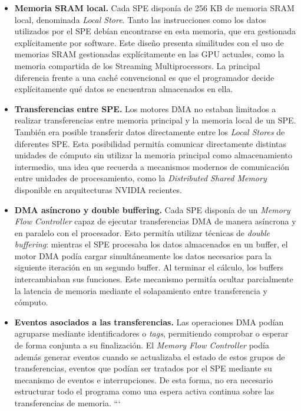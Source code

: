 \begin{itemize}

```
\item \textbf{Memoria SRAM local.}
Cada SPE disponía de 256 KB de memoria SRAM local, denominada \textit{Local Store}. Tanto las instrucciones como los datos utilizados por el SPE debían encontrarse en esta memoria, que era gestionada explícitamente por software. Este diseño presenta similitudes con el uso de memorias SRAM gestionadas explícitamente en las GPU actuales, como la memoria compartida de los Streaming Multiprocessors. La principal diferencia frente a una caché convencional es que el programador decide explícitamente qué datos se encuentran almacenados en ella.

\item \textbf{Transferencias entre SPE.}
Los motores DMA no estaban limitados a realizar transferencias entre memoria principal y la memoria local de un SPE. También era posible transferir datos directamente entre los \textit{Local Stores} de diferentes SPE. Esta posibilidad permitía comunicar directamente distintas unidades de cómputo sin utilizar la memoria principal como almacenamiento intermedio, una idea que recuerda a mecanismos modernos de comunicación entre unidades de procesamiento, como la \textit{Distributed Shared Memory} disponible en arquitecturas NVIDIA recientes.

\item \textbf{DMA asíncrono y double buffering.}
Cada SPE disponía de un \textit{Memory Flow Controller} capaz de ejecutar transferencias DMA de manera asíncrona y en paralelo con el procesador. Esto permitía utilizar técnicas de \textit{double buffering}: mientras el SPE procesaba los datos almacenados en un buffer, el motor DMA podía cargar simultáneamente los datos necesarios para la siguiente iteración en un segundo buffer. Al terminar el cálculo, los buffers intercambiaban sus funciones. Este mecanismo permitía ocultar parcialmente la latencia de memoria mediante el solapamiento entre transferencia y cómputo.

\item \textbf{Eventos asociados a las transferencias.}
Las operaciones DMA podían agruparse mediante identificadores o \textit{tags}, permitiendo comprobar o esperar de forma conjunta a su finalización. El \textit{Memory Flow Controller} podía además generar eventos cuando se actualizaba el estado de estos grupos de transferencias, eventos que podían ser tratados por el SPE mediante su mecanismo de eventos e interrupciones. De esta forma, no era necesario estructurar todo el programa como una espera activa continua sobre las transferencias de memoria.
```

\end{itemize}

